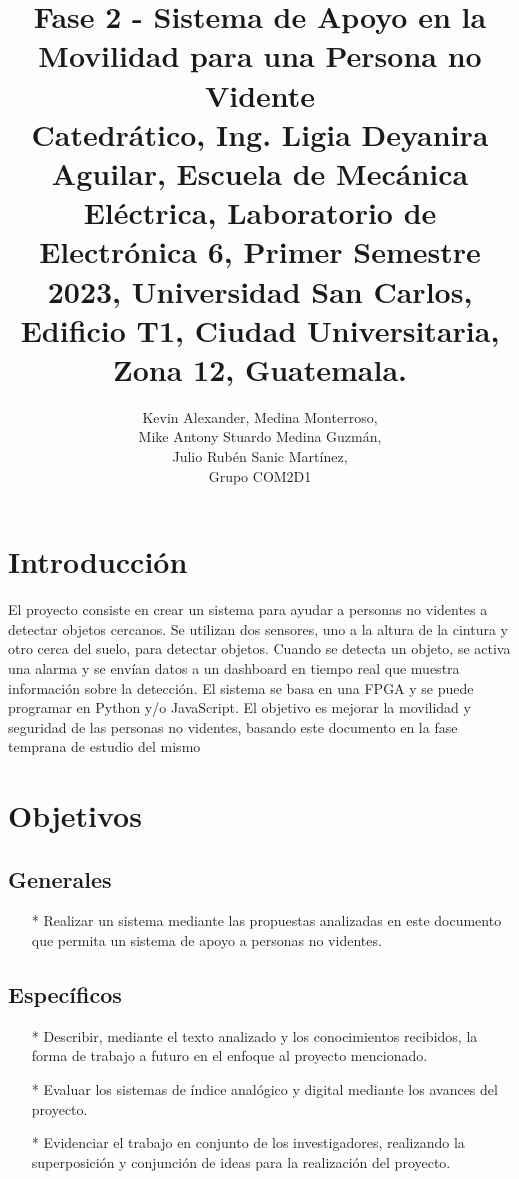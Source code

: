 \documentclass[journal]{IEEEtran}
\author{
    Kevin Alexander, Medina Monterroso,\IEEEmembership{ 2019-02084}\\
    Mike Antony Stuardo Medina Guzmán,\IEEEmembership{2019-03908} \\
    Julio Rubén Sanic Martínez,\IEEEmembership{2012-22286}\\Grupo COM2D1

}
\title{\textbf{Fase 2 -  Sistema de Apoyo en la
        Movilidad para una Persona no Vidente}\\
    \small{
        Catedrático, Ing. Ligia Deyanira Aguilar, Escuela de Mecánica Eléctrica, Laboratorio de Electrónica 6, Primer Semestre 2023, Universidad San Carlos, Edificio T1, Ciudad Universitaria, Zona 12, Guatemala.
    }}
\begin{document}
\maketitle

\section{Introducción}

El proyecto consiste en crear un sistema para ayudar a personas no videntes a
detectar objetos cercanos. Se utilizan dos sensores, uno a la altura de la
cintura y otro cerca del suelo, para detectar objetos. Cuando se detecta un
objeto, se activa una alarma y se envían datos a un dashboard en tiempo real
que muestra información sobre la detección. El sistema se basa en una FPGA y se
puede programar en Python y/o JavaScript. El objetivo es mejorar la movilidad y
seguridad de las personas no videntes, basando este documento en la fase
temprana de estudio del mismo


\section{Objetivos}

\subsection{Generales}

\begin{itemize}
\item[*] Realizar un sistema mediante las propuestas analizadas en este documento que permita un sistema de apoyo a personas no videntes.
\end{itemize}

\subsection{Específicos}

\begin{itemize}
\item[*] Describir, mediante el texto analizado y los conocimientos recibidos, la forma de trabajo a futuro en el enfoque al proyecto mencionado.

\item[*] Evaluar los sistemas de índice analógico y digital mediante los avances del proyecto.

\item[*] Evidenciar el trabajo en conjunto de los investigadores, realizando la superposición y conjunción de ideas para la realización del proyecto.

\end{itemize}
\end{document}
